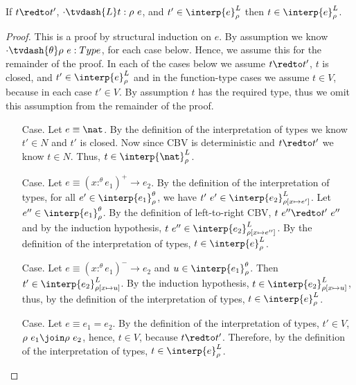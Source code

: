 \begin{lemma}[$\CRIII$]
  \label{lemma:criii}
  If $t \redto t'$, $\cdot \tvdash{L} t:\rho\ e$, and $t' \in \interp{e}^L_\rho$ 
  then $t \in \interp{e}^L_\rho$.
\end{lemma}
\begin{proof}
  This is a proof by structural induction on $e$.  
  By assumption we know $\cdot \tvdash{\theta} \rho\ e:Type$, for each case below.  Hence, we 
  assume this for the remainder of the proof.  In each of the cases below we assume
  $t \redto t'$, $t$ is closed, and $t' \in \interp{e}^L_\rho$ and in the function-type cases we 
  assume $t \in V$, because in each case $t' \in V$.  By assumption $t$ has the required type,
  thus we omit this assumption from the remainder of the proof.

  \begin{itemize}
  \item[Case.] Let $e \equiv \nat$.  
    By the definition of the interpretation of types we know
    $t' \in N$ and $t'$ is closed.  Now since CBV is deterministic and $t \redto t'$ we know
    $t \in N$.  Thus, $t \in \interp{\nat}^L_\rho$.

  \item[Case.] Let $e \equiv (x :^\theta e_1)^+ \rightarrow e_2$.    
    By the definition of the interpretation of types,
    for all $e' \in \interp{e_1}^\theta_\rho$, we have 
    $t'\ e' \in \interp{e_2}^L_{\rho[x \mapsto e']}$.
    Let $e'' \in \interp{e_1}^\theta_\rho$.  By the definition of left-to-right 
    CBV, $t\ e'' \redto t'\ e''$ and by the induction hypothesis, 
    $t\ e'' \in \interp{e_2}^L_{\rho[x \mapsto e'']}$.  By the definition of the interpretation of
    types, $t \in \interp{e}^L_{\rho}$.

  \item[Case.] Let $e \equiv (x :^\theta e_1)^- \to e_2$ and $u \in \interp{e_1}^\theta_\rho$.  
    Then $t' \in \interp{e_2}^L_{\rho[x \mapsto u]}$.  By the 
    induction hypothesis, $t \in \interp{e_2}^L_{\rho[x \mapsto u]}$, thus, by
    the definition of the interpretation of types, $t \in \interp{e}^L_\rho$.

  \item[Case.] Let $e \equiv e_1 = e_2$.
    By the definition of the interpretation of types, $t' \in V$,
    $\rho\ e_1 \join \rho\ e_2$, hence, $t \in V$, because 
    $t \redto t'$.  Therefore, 
    by the definition of the interpretation of types, $t \in \interp{e}^L_\rho$.
  \end{itemize}
\end{proof}

